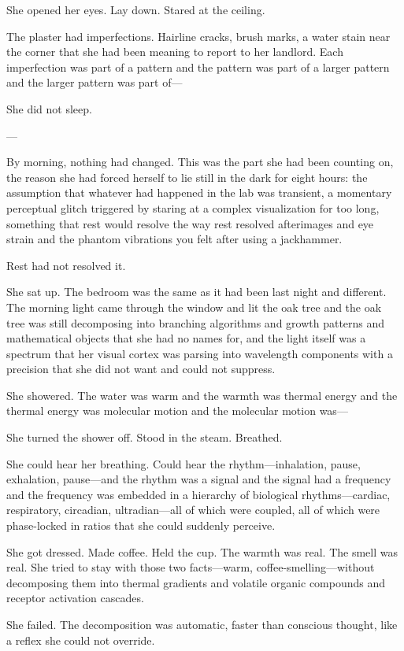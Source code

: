She opened her eyes. Lay down. Stared at the ceiling.

The plaster had imperfections. Hairline cracks, brush marks, a water stain near the corner that she had been meaning to report to her landlord. Each imperfection was part of a pattern and the pattern was part of a larger pattern and the larger pattern was part of---

She did not sleep.

---

By morning, nothing had changed. This was the part she had been counting on, the reason she had forced herself to lie still in the dark for eight hours: the assumption that whatever had happened in the lab was transient, a momentary perceptual glitch triggered by staring at a complex visualization for too long, something that rest would resolve the way rest resolved afterimages and eye strain and the phantom vibrations you felt after using a jackhammer.

Rest had not resolved it.

She sat up. The bedroom was the same as it had been last night and different. The morning light came through the window and lit the oak tree and the oak tree was still decomposing into branching algorithms and growth patterns and mathematical objects that she had no names for, and the light itself was a spectrum that her visual cortex was parsing into wavelength components with a precision that she did not want and could not suppress.

She showered. The water was warm and the warmth was thermal energy and the thermal energy was molecular motion and the molecular motion was---

She turned the shower off. Stood in the steam. Breathed.

She could hear her breathing. Could hear the rhythm---inhalation, pause, exhalation, pause---and the rhythm was a signal and the signal had a frequency and the frequency was embedded in a hierarchy of biological rhythms---cardiac, respiratory, circadian, ultradian---all of which were coupled, all of which were phase-locked in ratios that she could suddenly perceive.

She got dressed. Made coffee. Held the cup. The warmth was real. The smell was real. She tried to stay with those two facts---warm, coffee-smelling---without decomposing them into thermal gradients and volatile organic compounds and receptor activation cascades.

She failed. The decomposition was automatic, faster than conscious thought, like a reflex she could not override.

